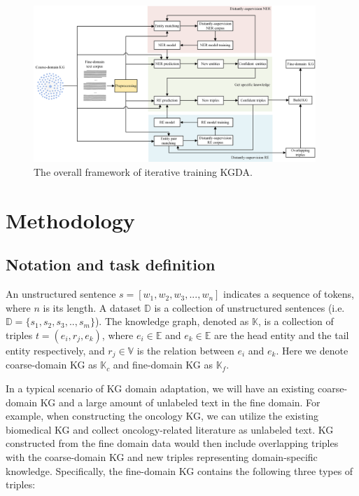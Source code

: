 \documentclass[sigconf]{acmart}
\begin{document}
\begin{figure}[t]
	\centering
	\includegraphics[width=0.95\textwidth]{figure1.png} %
	\caption{The overall framework of iterative training KGDA.}
	\label{fig1}
\end{figure}

\section{Methodology}
\subsection{Notation and task definition}
An unstructured sentence $s = [w_1,w_2,w_3,...,w_n]$ indicates a sequence of tokens, where $n$ is its length. A dataset $\mathbb{D}$ is a collection of unstructured sentences (i.e. $\mathbb{D} = \{s_1,s_2,s_3,..,s_m\}$). The knowledge graph, denoted as $\mathbb{K}$, is a collection of triples $t = (e_i,r_j,e_k)$, where $e_i \in \mathbb{E}$ and $e_k \in \mathbb{E}$ are the head entity and the tail entity respectively, and $r_j \in \mathbb{V}$ is the relation between $e_i$ and $e_k$. Here we denote coarse-domain KG as $\mathbb{K}_c$ and fine-domain KG as $\mathbb{K}_f$.

In a typical scenario of KG domain adaptation, we will have an existing coarse-domain KG and a large amount of unlabeled text in the fine domain. For example, when constructing the oncology KG, we can utilize the existing biomedical KG and collect oncology-related literature as unlabeled text. KG constructed from the fine domain data would then include overlapping triples with the coarse-domain KG and new triples representing domain-specific knowledge. Specifically, the fine-domain KG contains the following three types of triples:
\end{document}
